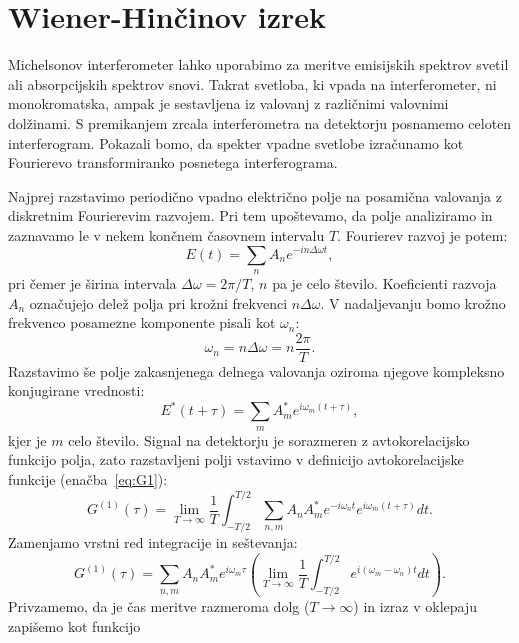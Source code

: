 \section{Wiener-Hinčinov izrek}
Michelsonov interferometer lahko uporabimo za meritve emisijskih spektrov svetil
ali absorpcijskih spektrov snovi. Takrat svetloba, ki vpada na interferometer,
ni monokromatska, ampak je sestavljena iz valovanj z različnimi valovnimi dolžinami.
S premikanjem zrcala interferometra na detektorju posnamemo celoten interferogram. Pokazali bomo, da
spekter vpadne svetlobe izračunamo kot Fourierevo transformiranko posnetega interferograma. 

Najprej razstavimo periodično vpadno električno polje na posamična valovanja z diskretnim
Fourierevim razvojem. Pri tem upoštevamo, da polje analiziramo in zaznavamo le v nekem končnem
časovnem intervalu $T$. Fourierev razvoj je potem:
\begin{equation}
E(t) = \sum_n A_n e^{-i n \Delta\omega t},
\label{eq:08_19}
\end{equation}
pri čemer je širina intervala $\Delta\omega = 2\pi/T$, $n$ pa je celo število. Koeficienti
razvoja $A_n$ označujejo delež polja pri krožni frekvenci $n\Delta \omega$. 
V nadaljevanju bomo krožno frekvenco posamezne komponente pisali kot 
$\omega_n$:
\begin{equation}
\omega_n = n \Delta \omega = n \frac{2\pi}{T}.
\label{eq:08_20}
\end{equation}
Razstavimo še polje zakasnjenega delnega valovanja oziroma njegove kompleksno konjugirane vrednosti:
\begin{equation}
E^*(t+\tau) = \sum_m A_m^* e^{i\omega_m (t + \tau)},
\label{eq:08_21}
\end{equation}
kjer je $m$ celo število. Signal na detektorju je sorazmeren z avtokorelacijsko funkcijo
polja, zato razstavljeni polji vstavimo v definicijo avtokorelacijske funkcije (enačba~\ref{eq:G1}):
\begin{equation}
G^{(1)}(\tau) = \lim_{T\to\infty} \frac{1}{T} \int_{-T/2}^{T/2} \sum_{n,m} A_n A_m^* e^{-i\omega_n t}
e^{i\omega_m (t+\tau)} dt.
\label{eq:08_22}
\end{equation}
Zamenjamo vrstni red integracije in seštevanja:
\begin{equation}
G^{(1)}(\tau) = 
\sum_{n,m} A_n A_m^*e^{i\omega_m\tau} \left(
\lim_{T\to\infty} \frac{1}{T} \int_{-T/2}^{T/2}e^{i(\omega_m - \omega_n)t}dt \right)\!\!.
\label{eq:08_23}
\end{equation}
Privzamemo, da je čas meritve razmeroma dolg ($T\to\infty$) in izraz v oklepaju zapišemo kot funkcijo
